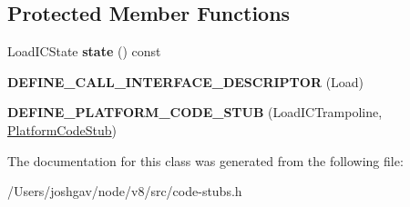 \subsection*{Protected Member Functions}
\begin{DoxyCompactItemize}
\item 
Load\+I\+C\+State {\bfseries state} () const \hypertarget{classv8_1_1internal_1_1_load_i_c_trampoline_stub_abb7023d71f7b26822dfaf90130573a82}{}\label{classv8_1_1internal_1_1_load_i_c_trampoline_stub_abb7023d71f7b26822dfaf90130573a82}

\item 
{\bfseries D\+E\+F\+I\+N\+E\+\_\+\+C\+A\+L\+L\+\_\+\+I\+N\+T\+E\+R\+F\+A\+C\+E\+\_\+\+D\+E\+S\+C\+R\+I\+P\+T\+OR} (Load)\hypertarget{classv8_1_1internal_1_1_load_i_c_trampoline_stub_abe21fcb70754d9b1d2ae05343ec65680}{}\label{classv8_1_1internal_1_1_load_i_c_trampoline_stub_abe21fcb70754d9b1d2ae05343ec65680}

\item 
{\bfseries D\+E\+F\+I\+N\+E\+\_\+\+P\+L\+A\+T\+F\+O\+R\+M\+\_\+\+C\+O\+D\+E\+\_\+\+S\+T\+UB} (Load\+I\+C\+Trampoline, \hyperlink{classv8_1_1internal_1_1_platform_code_stub}{Platform\+Code\+Stub})\hypertarget{classv8_1_1internal_1_1_load_i_c_trampoline_stub_a9a8e549750d956fe64b42df89a0e2675}{}\label{classv8_1_1internal_1_1_load_i_c_trampoline_stub_a9a8e549750d956fe64b42df89a0e2675}

\end{DoxyCompactItemize}


The documentation for this class was generated from the following file\+:\begin{DoxyCompactItemize}
\item 
/\+Users/joshgav/node/v8/src/code-\/stubs.\+h\end{DoxyCompactItemize}
